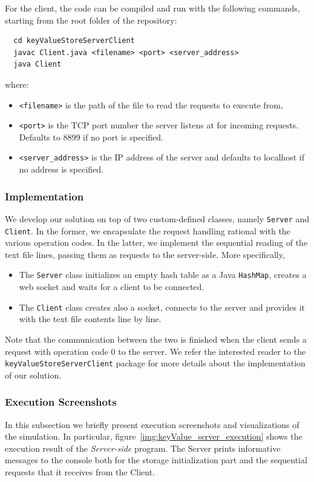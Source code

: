 \documentclass[acmlarge]{acmart}
\begin{document}
For the client, the code can be compiled and run with the following commands, starting from the root folder of the repository:
\begin{verbatim}
  cd keyValueStoreServerClient
  javac Client.java <filename> <port> <server_address>
  java Client
\end{verbatim}
where:
\begin{itemize}
  \item \texttt{<filename>} is the path of the file to read the requests to execute from,
  \item \texttt{<port>} is the TCP port number the server listens at for incoming requests. Defaults to 8899 if no port is specified.
  \item \texttt{<server\_address>} is the IP address of the server and defaults to localhost if no address is specified.
\end{itemize}

\subsubsection{Implementation}
We develop our solution on top of two custom-defined classes, namely \texttt{Server} and \texttt{Client}. In the former, we encapsulate the request handling rational with the various operation codes. In the latter, we implement the sequential reading of the text file lines, passing them as requests to the server-side. More specifically,
\begin{itemize}
  \item The \texttt{Server} class initializes an empty hash table as a Java \texttt{HashMap}, creates a web socket and waits for a client to be connected.
  \item The \texttt{Client} class creates also a socket, connects to the server and provides it with the text file contents line by line.
\end{itemize}
Note that the communication between the two is finished when the client sends a request with operation code 0 to the server. We refer the interested reader to the \texttt{keyValueStoreServerClient} package for more details about the implementation of our solution.

\subsubsection{Execution Screenshots}
In this subsection we briefly present execution screenshots and visualizations of the simulation. In particular, figure~\ref{img:keyValue_server_execution} shows the execution result of the \emph{Server-side} program. The Server prints informative messages to the console both for the storage initialization part and the sequential requests that it receives from the Client.
\end{document}
